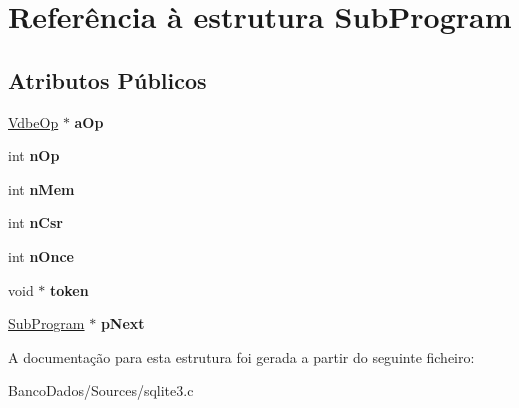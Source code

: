 \hypertarget{struct_sub_program}{\section{Referência à estrutura Sub\-Program}
\label{struct_sub_program}
}
\subsection*{Atributos Públicos}
\begin{DoxyCompactItemize}
\item 
\hypertarget{struct_sub_program_aa9bb1992fed633d182076a35d6448c7d}{\hyperlink{struct_vdbe_op}{Vdbe\-Op} $\ast$ {\bfseries a\-Op}}\label{struct_sub_program_aa9bb1992fed633d182076a35d6448c7d}

\item 
\hypertarget{struct_sub_program_a6fe204a75ab8254c453be77f024b6d69}{int {\bfseries n\-Op}}\label{struct_sub_program_a6fe204a75ab8254c453be77f024b6d69}

\item 
\hypertarget{struct_sub_program_a9bece42fdeb81085809d7c2f8aa05616}{int {\bfseries n\-Mem}}\label{struct_sub_program_a9bece42fdeb81085809d7c2f8aa05616}

\item 
\hypertarget{struct_sub_program_a83b18aa5cc63aecdbf996c16af1e48bb}{int {\bfseries n\-Csr}}\label{struct_sub_program_a83b18aa5cc63aecdbf996c16af1e48bb}

\item 
\hypertarget{struct_sub_program_a907d5933dd0149be1ef90fcbe91e3c58}{int {\bfseries n\-Once}}\label{struct_sub_program_a907d5933dd0149be1ef90fcbe91e3c58}

\item 
\hypertarget{struct_sub_program_aaea3b67899b092476b107d22a4e2022d}{void $\ast$ {\bfseries token}}\label{struct_sub_program_aaea3b67899b092476b107d22a4e2022d}

\item 
\hypertarget{struct_sub_program_a7da35488ac58a64fa30b88da56aac8b3}{\hyperlink{struct_sub_program}{Sub\-Program} $\ast$ {\bfseries p\-Next}}\label{struct_sub_program_a7da35488ac58a64fa30b88da56aac8b3}

\end{DoxyCompactItemize}


A documentação para esta estrutura foi gerada a partir do seguinte ficheiro\-:\begin{DoxyCompactItemize}
\item 
Banco\-Dados/\-Sources/sqlite3.\-c\end{DoxyCompactItemize}
